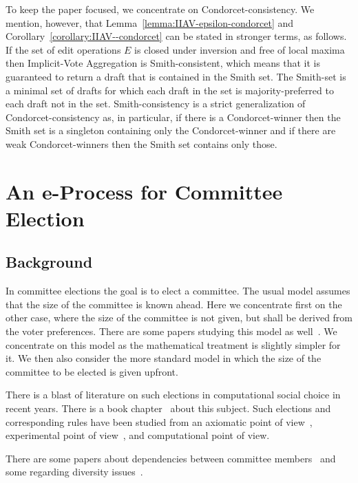 \documentclass{llncs}
\begin{document}
\begin{remark}
%
To keep the paper focused, we concentrate on Condorcet-consistency. We mention, however, that Lemma~\ref{lemma:IIAV-epsilon-condorcet} and Corollary~\ref{corollary:IIAV--condorcet} can be stated in stronger terms, as follows. If the set of edit operations $E$ is closed under inversion and free of local maxima then Implicit-Vote Aggregation is Smith-consistent, which means that it is guaranteed to return a draft that is contained in the Smith set.  The Smith-set is a minimal set of drafts for which each draft in the set is majority-preferred to each draft not in the set. Smith-consistency is a strict generalization of Condorcet-consistency as, in particular, if there is a Condorcet-winner then the Smith set is a singleton containing only the Condorcet-winner and if there are weak Condorcet-winners then the Smith set contains only those.
%
\end{remark}


\section{An e-Process for Committee Election}
\label{section:commiteee election}


\subsection{Background}

In committee elections the goal is to elect a committee. The usual model assumes that the size of the committee is known ahead.
Here we concentrate first on the other case, where the size of the committee is not given, but shall be derived from the voter preferences. There are some papers studying this model as well~\cite{kilgourvnw,vnw}.
We concentrate on this model as the mathematical treatment is slightly simpler for it. We then also consider the more standard model in which the size of the committee to be elected is given upfront.

There is a blast of literature on such elections in computational social choice in recent years. There is a book chapter~\cite{mwchapter} about this subject. Such elections and corresponding rules have been studied from an axiomatic point of view~\cite{propertiesofmw,csrhierarchy}, experimental point of view~\cite{mw2d}, and computational point of view.

There are some papers about dependencies between committee members~\cite{interintra} and some regarding diversity issues~\cite{aziz2018rule,BFIa}.
\end{document}
